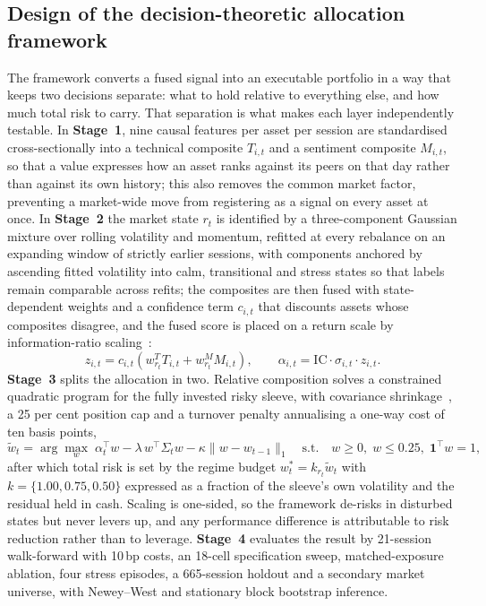 \subsection{Design of the decision-theoretic allocation framework}

The framework converts a fused signal into an executable portfolio in a way that keeps two
decisions separate: what to hold relative to everything else, and how much total risk to carry.
That separation is what makes each layer independently testable. In \textbf{Stage~1}, nine
causal features per asset per session are standardised cross-sectionally into a technical
composite $T_{i,t}$ and a sentiment composite $M_{i,t}$, so that a value expresses how an asset
ranks against its peers on that day rather than against its own history; this also removes the
common market factor, preventing a market-wide move from registering as a signal on every asset
at once. In \textbf{Stage~2} the market state $r_t$ is identified by a three-component Gaussian
mixture over rolling volatility and momentum, refitted at every rebalance on an expanding
window of strictly earlier sessions, with components anchored by ascending fitted volatility
into calm, transitional and stress states so that labels remain comparable across refits; the
composites are then fused with state-dependent weights and a confidence term $c_{i,t}$ that
discounts assets whose composites disagree, and the fused score is placed on a return scale by
information-ratio scaling~\cite{grinold2000}:
\begin{equation}
z_{i,t} = c_{i,t}\left(w^{T}_{r_t} T_{i,t} + w^{M}_{r_t} M_{i,t}\right),
\qquad
\alpha_{i,t} = \mathrm{IC}\cdot\sigma_{i,t}\cdot z_{i,t}.
\end{equation}
\textbf{Stage~3} splits the allocation in two. Relative composition solves a constrained
quadratic program for the fully invested risky sleeve, with covariance
shrinkage~\cite{ledoit2004}, a 25 per cent position cap and a turnover penalty annualising a
one-way cost of ten basis points,
\begin{equation}
\tilde{w}_t = \arg\max_{w}\;
\alpha_t^{\!\top} w - \lambda\, w^{\!\top}\Sigma_t w - \kappa\|w - w_{t-1}\|_1
\quad\text{s.t.}\quad w \ge 0,\; w \le 0.25,\; \mathbf{1}^{\!\top} w = 1,
\end{equation}
after which total risk is set by the regime budget $w_t^{*} = k_{r_t}\tilde{w}_t$ with
$k = \{1.00, 0.75, 0.50\}$ expressed as a fraction of the sleeve's own volatility and the
residual held in cash. Scaling is one-sided, so the framework de-risks in disturbed states but
never levers up, and any performance difference is attributable to risk reduction rather than to
leverage. \textbf{Stage~4} evaluates the result by 21-session walk-forward with 10\,bp costs, an
18-cell specification sweep, matched-exposure ablation, four stress episodes, a 665-session
holdout and a secondary market universe, with Newey--West and stationary block bootstrap
inference.


